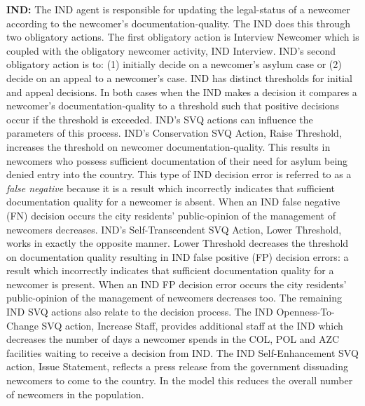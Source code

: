\documentclass{scspaperproc}
\theoremstyle{scsthe}
\begin{document}
{\bf IND:} The IND agent is responsible for updating the legal-status of a newcomer according to the newcomer's documentation-quality. The IND does this through two obligatory actions. The first obligatory action is Interview Newcomer which is coupled with the obligatory newcomer activity, IND Interview. IND's second obligatory action is to: (1) initially decide on a newcomer's asylum case or (2) decide on an appeal to a newcomer's case. IND has distinct thresholds for initial and appeal decisions. In both cases when the IND makes a decision it compares a newcomer's documentation-quality to a threshold such that positive decisions occur if the threshold is exceeded. IND's SVQ actions can influence the parameters of this process. IND's Conservation SVQ Action, Raise Threshold, increases the threshold on newcomer documentation-quality. This results in newcomers who possess sufficient documentation of their need for asylum being denied entry into the country. This type of IND decision error is referred to as a \emph{false negative} because it is a result which incorrectly indicates that sufficient documentation quality for a newcomer is absent. When an IND false negative (FN) decision occurs the city residents' public-opinion of the management of newcomers decreases. IND's Self-Transcendent SVQ Action, Lower Threshold, works in exactly the opposite manner. Lower Threshold decreases the threshold on documentation quality resulting in IND false positive (FP) decision errors: a result which incorrectly indicates that sufficient documentation quality for a newcomer is present. When an IND FP decision error occurs the city residents' public-opinion of the management of newcomers decreases too. The remaining IND SVQ actions also relate to the decision process. The IND Openness-To-Change SVQ action, Increase Staff, provides additional staff at the IND which decreases the number of days a newcomer spends in the COL, POL and AZC facilities waiting to receive a decision from IND. The IND Self-Enhancement SVQ action, Issue Statement, reflects a press release from the government dissuading newcomers to come to the country. In the model this reduces the overall number of newcomers in the population.
\end{document}
